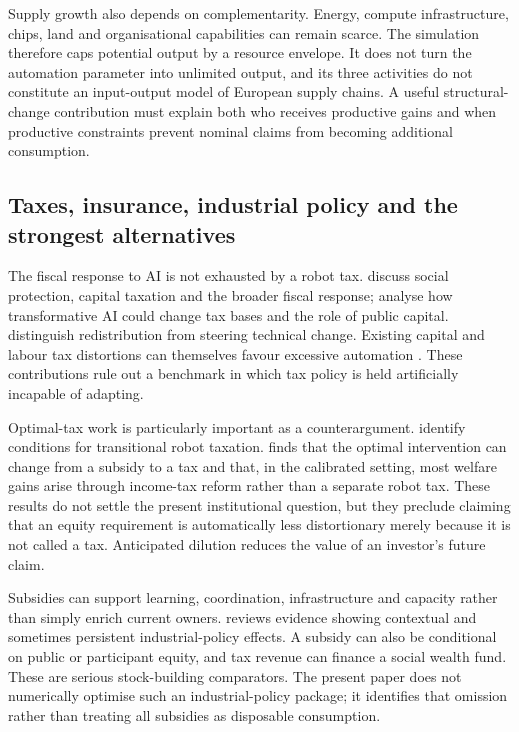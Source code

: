 Supply growth also depends on complementarity. Energy, compute infrastructure, chips, land and organisational capabilities can remain scarce. The simulation therefore caps potential output by a resource envelope. It does not turn the automation parameter into unlimited output, and its three activities do not constitute an input-output model of European supply chains. A useful structural-change contribution must explain both who receives productive gains and when productive constraints prevent nominal claims from becoming additional consumption.

\subsection{Taxes, insurance, industrial policy and the strongest alternatives}
The fiscal response to AI is not exhausted by a robot tax. \citet{brollo2024} discuss social protection, capital taxation and the broader fiscal response; \citet{korinek2026} analyse how transformative AI could change tax bases and the role of public capital. \citet{korinekstiglitz2026} distinguish redistribution from steering technical change. Existing capital and labour tax distortions can themselves favour excessive automation \citep{acemoglutax2020}. These contributions rule out a benchmark in which tax policy is held artificially incapable of adapting.

Optimal-tax work is particularly important as a counterargument. \citet{guerreiro2022} identify conditions for transitional robot taxation. \citet{thuemmel2023} finds that the optimal intervention can change from a subsidy to a tax and that, in the calibrated setting, most welfare gains arise through income-tax reform rather than a separate robot tax. These results do not settle the present institutional question, but they preclude claiming that an equity requirement is automatically less distortionary merely because it is not called a tax. Anticipated dilution reduces the value of an investor's future claim.

Subsidies can support learning, coordination, infrastructure and capacity rather than simply enrich current owners. \citet{juhasz2024} reviews evidence showing contextual and sometimes persistent industrial-policy effects. A subsidy can also be conditional on public or participant equity, and tax revenue can finance a social wealth fund. These are serious stock-building comparators. The present paper does not numerically optimise such an industrial-policy package; it identifies that omission rather than treating all subsidies as disposable consumption.

